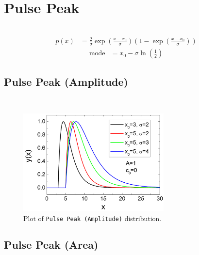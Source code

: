 \clearpage
\section{Pulse Peak} ~\\
\label{sec:Pulse}
\begin{align}
p(x) &= \frac{2}{\sigma}\exp\left(\frac{x-x_0}{\sigma}\right) \left(1-\exp\left(\frac{x-x_0}{\sigma}\right)\right)
\end{align}
\begin{align}
\mbox{mode} &= x_0 - \sigma \ln\left(\frac12\right)
\end{align}
\subsection{Pulse Peak (Amplitude)} ~\\
\label{sec:PulseAmplitude}

\begin{figure}[htb]
\begin{center}
\includegraphics[width=0.6824\textwidth]{PulseAmplitude.png}
\end{center}
\caption{Plot of \texttt{Pulse Peak (Amplitude)} distribution.}
\label{fig:PulseAmplitude}
\end{figure}

\clearpage
\subsection{Pulse Peak (Area)} ~\\
\label{sec:PulseArea}

